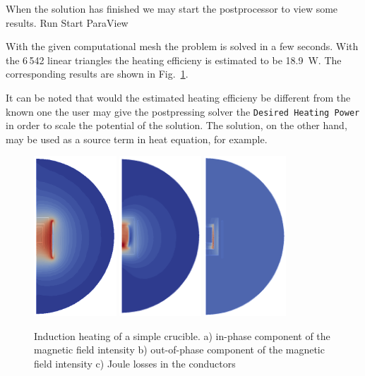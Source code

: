 When the solution has finished we may start the postprocessor to view some results.
\ttbegin
Run
  Start ParaView
\ttend


With the given computational mesh the problem is solved in 
a few seconds. With the 6\,542 linear triangles the heating
efficieny is estimated to be 18.9~W. The corresponding results are shown
in Fig.~\ref{fig:ind_heat1}.

It can be noted that would the estimated heating efficieny be different from the known one
the user may give the postpressing solver the \texttt{Desired Heating Power} in order to scale 
the potential of the solution. The solution, on the other hand, may be used as a source term 
in heat equation, for example. 

\begin{figure}
\begin{center}
  \includegraphics[height=60mm]{Induction_B_re}
  \includegraphics[height=60mm]{Induction_B_im}
  \includegraphics[height=60mm]{Induction_Joule_heating}


\end{center}
\caption{Induction heating of a simple crucible. 
a) in-phase component of the magnetic field intensity
b) out-of-phase component of the magnetic field intensity
c) Joule losses in the conductors}
\label{fig:ind_heat1}
\end{figure}

